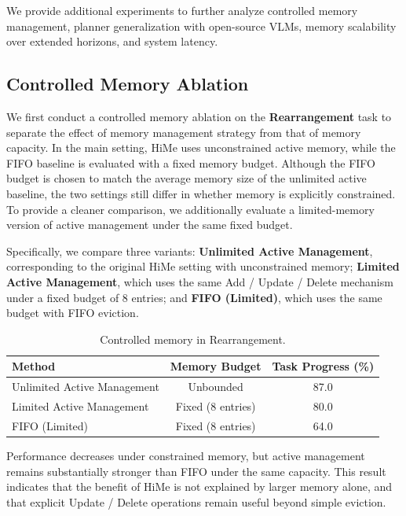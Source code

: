 We provide additional experiments to further analyze controlled memory management, planner generalization with open-source VLMs, memory scalability over extended horizons, and system latency.

\subsection{Controlled Memory Ablation}
\label{sec:controlled_memory_ablation}

We first conduct a controlled memory ablation on the \textbf{Rearrangement} task to separate the effect of memory management strategy from that of memory capacity. In the main setting, HiMe uses unconstrained active memory, while the FIFO baseline is evaluated with a fixed memory budget. Although the FIFO budget is chosen to match the average memory size of the unlimited active baseline, the two settings still differ in whether memory is explicitly constrained. To provide a cleaner comparison, we additionally evaluate a limited-memory version of active management under the same fixed budget.

Specifically, we compare three variants: \textbf{Unlimited Active Management}, corresponding to the original HiMe setting with unconstrained memory; \textbf{Limited Active Management}, which uses the same Add / Update / Delete mechanism under a fixed budget of 8 entries; and \textbf{FIFO (Limited)}, which uses the same budget with FIFO eviction.

\begin{table}[H]
\centering
\caption{Controlled memory in Rearrangement.}
\label{tab:controlled_memory_ablation}
\begin{tabular}{lcc}
\toprule
\textbf{Method} & \textbf{Memory Budget} & \textbf{Task Progress (\%)} \\
\midrule
Unlimited Active Management & Unbounded & 87.0 \\
Limited Active Management & Fixed (8 entries) & 80.0 \\
FIFO (Limited) & Fixed (8 entries) & 64.0 \\
\bottomrule
\end{tabular}
\end{table}

Performance decreases under constrained memory, but active management remains substantially stronger than FIFO under the same capacity. This result indicates that the benefit of HiMe is not explained by larger memory alone, and that explicit Update / Delete operations remain useful beyond simple eviction.

